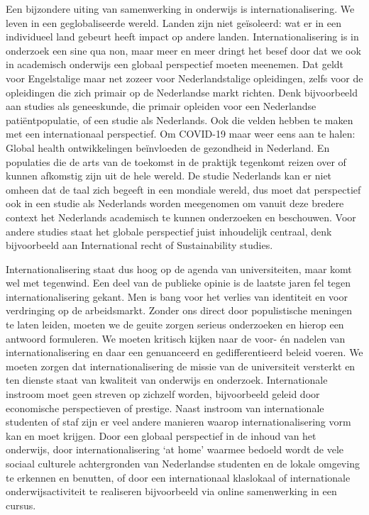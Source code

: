 \documentclass[empirical, authordate, ]{new-jote-article}
\begin{document}
	Een bijzondere uiting van samenwerking in onderwijs is internationalisering. We leven in een geglobaliseerde wereld. Landen zijn niet geïsoleerd: wat er in een individueel land gebeurt heeft impact op andere landen. Internationalisering is in onderzoek een sine qua non, maar meer en meer dringt het besef door dat we ook in academisch onderwijs een globaal perspectief moeten meenemen. Dat geldt voor Engelstalige maar net zozeer voor Nederlandstalige opleidingen, zelfs voor de opleidingen die zich primair op de Nederlandse markt richten. Denk bijvoorbeeld aan studies als geneeskunde, die primair opleiden voor een Nederlandse patiëntpopulatie, of een studie als Nederlands. Ook die velden hebben te maken met een internationaal perspectief. Om COVID-19 maar weer eens aan te halen: Global health ontwikkelingen beïnvloeden de gezondheid in Nederland. En populaties die de arts van de toekomst in de praktijk tegenkomt reizen over of kunnen afkomstig zijn uit de hele wereld. De studie Nederlands kan er niet omheen dat de taal zich begeeft in een mondiale wereld, dus moet dat perspectief ook in een studie als Nederlands worden meegenomen om vanuit deze bredere context het Nederlands academisch te kunnen onderzoeken en beschouwen. Voor andere studies staat het globale perspectief juist inhoudelijk centraal, denk bijvoorbeeld aan International recht of Sustainability studies.



	Internationalisering staat dus hoog op de agenda van universiteiten, maar komt wel met tegenwind. Een deel van de publieke opinie is de laatste jaren fel tegen internationalisering gekant. Men is bang voor het verlies van identiteit en voor verdringing op de arbeidsmarkt. Zonder ons direct door populistische meningen te laten leiden, moeten we de geuite zorgen serieus onderzoeken en hierop een antwoord formuleren. We moeten kritisch kijken naar de voor- én nadelen van internationalisering en daar een genuanceerd en gedifferentieerd beleid voeren. We moeten zorgen dat internationalisering de missie van de universiteit versterkt en ten dienste staat van kwaliteit van onderwijs en onderzoek. Internationale instroom moet geen streven op zichzelf worden, bijvoorbeeld geleid door economische perspectieven of prestige. Naast instroom van internationale studenten of staf zijn er veel andere manieren waarop internationalisering vorm kan en moet krijgen. Door een globaal perspectief in de inhoud van het onderwijs, door internationalisering ‘at home' waarmee bedoeld wordt de vele sociaal culturele achtergronden van Nederlandse studenten en de lokale omgeving te erkennen en benutten, of door een internationaal klaslokaal of internationale onderwijsactiviteit te realiseren bijvoorbeeld via online samenwerking in een cursus.
\end{document}
